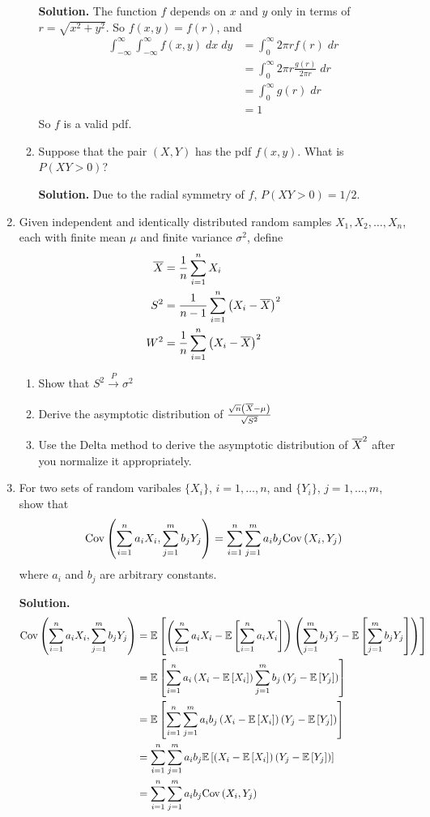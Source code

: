\documentclass[titlepage]{article}
\begin{document}
\begin{enumerate}
\begin{enumerate}
  \textbf{Solution.} The function $f$ depends on $x$ and $y$ only in terms of  $r = \sqrt{x^2 + y^2}$. So $f(x, y) = f(r)$, and
  \[\begin{aligned}
  \int_{-\infty}^\infty \int_{-\infty}^\infty f(x, y) \; dx \; dy &= \int_0^\infty 2\pi r f(r)\; dr \\
  &= \int_0^\infty 2 \pi r \frac{g(r)}{2 \pi r} \; dr\\
  &= \int_0^\infty g(r) \; dr \\
  &= 1
  \end{aligned}\]
  So $f$ is a valid pdf.

  \item Suppose that the pair $(X, Y)$ has the pdf $f(x, y)$. What is $P(XY > 0)$?

  \textbf{Solution.} Due to the radial symmetry of $f$, $P(XY > 0) = 1/2$.
  \end{enumerate}

\item Given independent and identically distributed random samples $X_1, X_2, \ldots, X_n$, each with finite mean $\mu$ and finite variance $\sigma^2$, define
\[\begin{aligned}
\overline{X} &= \frac{1}{n} \sum_{i = 1}^n X_i \\
S^2 &= \frac{1}{n-1} \sum_{i = 1}^n \left(X_i - \overline{X}\right)^2 \\
W^2 &= \frac{1}{n} \sum_{i = 1}^n \left(X_i - \overline{X}\right)^2
\end{aligned}\]
  \begin{enumerate}
  \item Show that $S^2 \xrightarrow{P} \sigma^2$
  \item Derive the asymptotic distribution of $\frac{\sqrt{n}\left(\overline{X} - \mu\right)}{\sqrt{S^2}}$
  \item Use the Delta method to derive the asymptotic distribution of $\overline{X}^2$ after you normalize it appropriately.
  \end{enumerate}

\item For two sets of random varibales $\{X_i\}$, $i = 1, \ldots, n$, and $\{Y_i\}$, $j = 1, \ldots, m$, show that
\[\text{Cov}\left( \sum_{i=1}^n a_i X_i, \sum_{j=1}^m b_j Y_j \right) = \sum_{i=1}^n \sum_{j=1}^m a_i b_j \text{Cov}\left( X_i, Y_j \right)\]
where $a_i$ and $b_j$ are arbitrary constants.

\textbf{Solution.}
\[\begin{aligned}
\text{Cov}\left( \sum_{i=1}^n a_i X_i, \sum_{j=1}^m b_j Y_j \right) &= \mathbb{E}\left[ \left(\sum_{i=1}^n a_i X_i - \mathbb{E}\left[ \sum_{i=1}^n a_i X_i \right]\right) \left( \sum_{j=1}^m b_j Y_j - \mathbb{E}\left[ \sum_{j=1}^m b_j Y_j \right]\right) \right] \\
&= \mathbb{E}\left[ \sum_{i=1}^n a_i \left(X_i - \mathbb{E}\left[ X_i \right]\right)  \sum_{j=1}^m b_j \left(Y_j - \mathbb{E}\left[ Y_j \right]\right) \right] \\
&= \mathbb{E}\left[ \sum_{i=1}^n \sum_{j=1}^m a_i b_j \left(X_i - \mathbb{E}\left[ X_i \right]\right) \left(Y_j - \mathbb{E}\left[ Y_j \right]\right) \right] \\
&= \sum_{i=1}^n \sum_{j=1}^m a_i b_j \mathbb{E}\left[ \left(X_i - \mathbb{E}\left[ X_i \right]\right) \left(Y_j - \mathbb{E}\left[ Y_j \right]\right) \right] \\
&= \sum_{i=1}^n \sum_{j=1}^m a_i b_j \text{Cov}\left( X_i, Y_j \right) \\
\end{aligned}\]


\end{enumerate}
\end{document}
